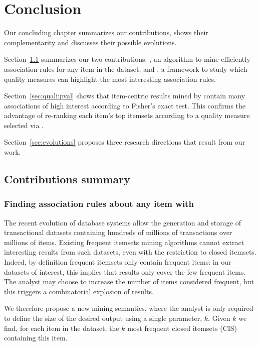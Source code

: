 \chapter{Conclusion}
\label{chap:conclusion}


\minitoc

Our concluding chapter summarizes our contributions, shows their complementarity
and discusses their possible evolutions.

Section~\ref{sec:conc:summary} summarizes our two contributions:
\toppi, an algorithm to mine efficiently association rules for any item in the dataset,
and \capa, a framework to study which quality measures
can highlight the most interesting association rules.

Section~\ref{sec:quali:pval} shows that item-centric results mined by \toppi
contain many associations of high interest according to Fisher's exact test.
This confirms the advantage of re-ranking each item's top itemsets according to a quality measure selected via \capa.

Section~\ref{sec:evolutions}
proposes three research directions that result from our work.


\section{Contributions summary}
\label{sec:conc:summary}

\subsection{Finding association rules about any item with \toppi}

The recent evolution of database systems allow the generation and storage
of transactional datasets containing hundreds of millions of transactions over millions of items.
Existing frequent itemsets mining algorithms cannot extract interesting results from such datasets,
even with the restriction to closed itemsets.
Indeed, by definition frequent itemsets only contain frequent items:
in our datasets of interest, this implies that results only cover the few frequent items.
The analyst may choose to increase the number of items considered frequent,
but this triggers a combinatorial explosion of results.

We therefore propose a new mining semantics,
where the analyst is only required to define the size of the desired output
using a single parameter, $k$.
Given $k$ we find,
for each item in the dataset,
the $k$ most frequent closed itemsets (CIS) containing this item.

